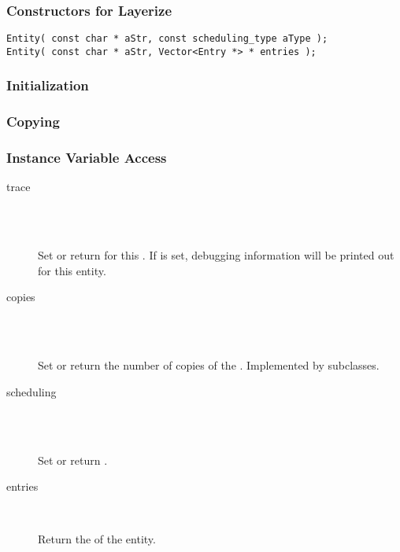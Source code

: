 \subsubsection{Constructors for Layerize}

\begin{verbatim}
Entity( const char * aStr, const scheduling_type aType );
Entity( const char * aStr, Vector<Entry *> * entries );
\end{verbatim}

\subsubsection{Initialization}
\subsubsection{Copying}
\subsubsection{Instance Variable Access}

\begin{description}
\item[trace] \texonly{---} \\
\\

Set or return  for this
.  If  is set, debugging information will be
printed out for this entity.

\item[copies] \texonly{---} \\
\\

Set or return the number of copies of the .  Implemented
by subclasses.

\item[scheduling] \texonly{---} \\
\\

Set or return .

\item[entries] \texonly{---} \\

Return the  of the entity.  

\end{description}

